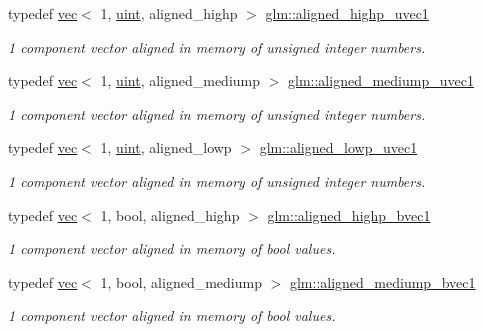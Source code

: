 \begin{DoxyCompactItemize}
typedef \mbox{\hyperlink{structglm_1_1vec}{vec}}$<$ 1, \mbox{\hyperlink{group__core__precision_ga4fd29415871152bfb5abd588334147c8}{uint}}, aligned\+\_\+highp $>$ \mbox{\hyperlink{group__gtc__type__aligned_ga3ba8c6f6b81f57159b0536ce5d4339d0}{glm\+::aligned\+\_\+highp\+\_\+uvec1}}
\begin{DoxyCompactList}\small\item\em 1 component vector aligned in memory of unsigned integer numbers. \end{DoxyCompactList}\item 
typedef \mbox{\hyperlink{structglm_1_1vec}{vec}}$<$ 1, \mbox{\hyperlink{group__core__precision_ga4fd29415871152bfb5abd588334147c8}{uint}}, aligned\+\_\+mediump $>$ \mbox{\hyperlink{group__gtc__type__aligned_ga7988ca1255907c807b71cb09a7cb590a}{glm\+::aligned\+\_\+mediump\+\_\+uvec1}}
\begin{DoxyCompactList}\small\item\em 1 component vector aligned in memory of unsigned integer numbers. \end{DoxyCompactList}\item 
typedef \mbox{\hyperlink{structglm_1_1vec}{vec}}$<$ 1, \mbox{\hyperlink{group__core__precision_ga4fd29415871152bfb5abd588334147c8}{uint}}, aligned\+\_\+lowp $>$ \mbox{\hyperlink{group__gtc__type__aligned_ga00df1f632a2e6c173796b5cede1be57c}{glm\+::aligned\+\_\+lowp\+\_\+uvec1}}
\begin{DoxyCompactList}\small\item\em 1 component vector aligned in memory of unsigned integer numbers. \end{DoxyCompactList}\item 
typedef \mbox{\hyperlink{structglm_1_1vec}{vec}}$<$ 1, bool, aligned\+\_\+highp $>$ \mbox{\hyperlink{group__gtc__type__aligned_ga92b3b4333bdc881b8ae27414162df481}{glm\+::aligned\+\_\+highp\+\_\+bvec1}}
\begin{DoxyCompactList}\small\item\em 1 component vector aligned in memory of bool values. \end{DoxyCompactList}\item 
typedef \mbox{\hyperlink{structglm_1_1vec}{vec}}$<$ 1, bool, aligned\+\_\+mediump $>$ \mbox{\hyperlink{group__gtc__type__aligned_gad5720386d2fb75c295f49312284abd13}{glm\+::aligned\+\_\+mediump\+\_\+bvec1}}
\begin{DoxyCompactList}\small\item\em 1 component vector aligned in memory of bool values. \end{DoxyCompactList}\item 

\end{DoxyCompactItemize}
